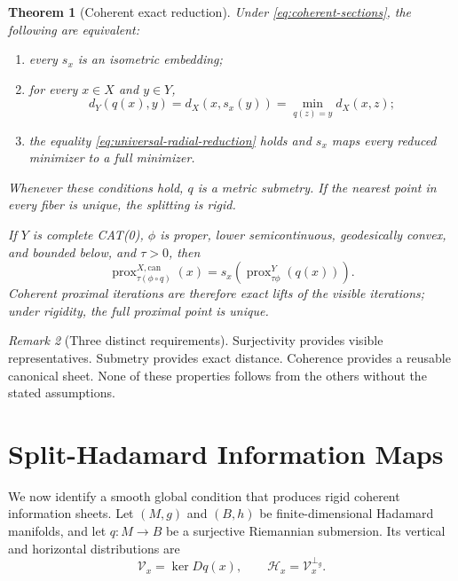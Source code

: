 \documentclass[10pt]{article}
\theoremstyle{plain}
\newtheorem{theorem}{Theorem}[section]
\theoremstyle{definition}
\theoremstyle{remark}
\newtheorem{remark}[theorem]{Remark}
\newcommand{\prox}{\operatorname{prox}}
\begin{document}
\begin{theorem}[Coherent exact reduction]
\label{thm:coherent-reduction}
Under \eqref{eq:coherent-sections}, the following are equivalent:
\begin{enumerate}[label=(\Alph*),leftmargin=*]
  \item every \(s_x\) is an isometric embedding;
  \item for every \(x\in X\) and \(y\in Y\),
  \begin{equation}
    d_Y(q(x),y)
    =d_X(x,s_x(y))
    =\min_{q(z)=y}d_X(x,z);
    \label{eq:coherent-fiber-distance}
  \end{equation}
  \item the equality \eqref{eq:universal-radial-reduction} holds and
  \(s_x\) maps every reduced minimizer to a full minimizer.
\end{enumerate}
Whenever these conditions hold, \(q\) is a metric submetry.  If the nearest
point in every fiber is unique, the splitting is rigid.

If \(Y\) is complete CAT(0), \(\phi\) is proper, lower semicontinuous,
geodesically convex, and bounded below, and \(\tau>0\), then
\begin{equation}
  \boxed{
  \prox^{X,\mathrm{can}}_{\tau(\phi\circ q)}(x)
  =
  s_x\!\left(\prox^Y_{\tau\phi}(q(x))\right).}
  \label{eq:coherent-prox}
\end{equation}
Coherent proximal iterations are therefore exact lifts of the visible
iterations; under rigidity, the full proximal point is unique.
\end{theorem}

\begin{remark}[Three distinct requirements]
Surjectivity provides visible representatives.  Submetry provides exact
distance.  Coherence provides a reusable canonical sheet.  None of these
properties follows from the others without the stated assumptions.
\end{remark}

\section{Split-Hadamard Information Maps}
\label{sec:split-hadamard}

We now identify a smooth global condition that produces rigid coherent
information sheets.  Let \((M,g)\) and \((B,h)\) be finite-dimensional
Hadamard manifolds, and let \(q:M\to B\) be a surjective Riemannian
submersion.  Its vertical and horizontal distributions are
\[
  \mathcal V_x=\ker Dq(x),
  \qquad
  \mathcal H_x=\mathcal V_x^{\perp_g}.
\]
\end{document}
